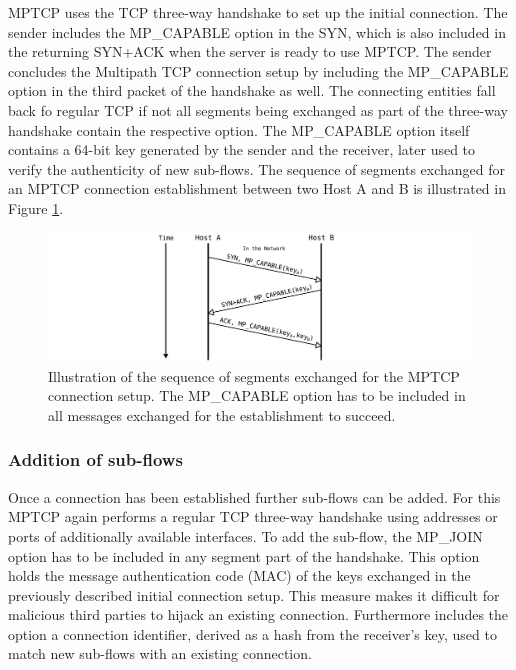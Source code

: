 MPTCP uses the TCP three-way handshake to set up the initial connection. The sender includes the MP\_CAPABLE option in the SYN, which is also included in the returning SYN+ACK when the server is ready to use MPTCP. The sender concludes the Multipath TCP connection setup by including the MP\_CAPABLE option in the third packet of the handshake as well. The connecting entities fall back fo regular TCP if not all segments being exchanged as part of the three-way handshake contain the respective option. The MP\_CAPABLE option itself contains a 64-bit key generated by the sender and the receiver, later used to verify the authenticity of new sub-flows. The sequence of segments exchanged for an MPTCP connection establishment between two Host A and B is illustrated in Figure \ref{fig:MTCPConnectionEstablishment}.

\begin{figure}[H]
	\begin{center} 
		\def\svgwidth{1\textwidth}
		\includegraphics[scale=0.24]{../illustrations/importantConcepts/MPTCPHandshake.pdf} 
		\caption[Caption for the list of figures.]{Illustration of the sequence of segments exchanged for the MPTCP connection setup. The MP\_CAPABLE option has to be included in all messages exchanged for the establishment to succeed.}
		\label{fig:MTCPConnectionEstablishment}
	\end{center}
\end{figure}

\subsubsection{Addition of sub-flows}

Once a connection has been established further sub-flows can be added. For this MPTCP again performs a regular TCP three-way handshake using addresses or ports of additionally available interfaces. To add the sub-flow, the MP\_JOIN option has to be included in any segment part of the handshake. This option holds the message authentication code (MAC) of the keys exchanged in the previously described initial connection setup. This measure makes it difficult for malicious third parties to hijack an existing connection. Furthermore includes the option a connection identifier, derived as a hash from the receiver's key, used to match new sub-flows with an existing connection. 

